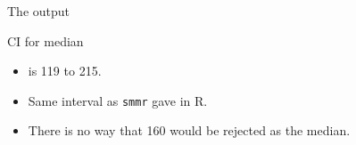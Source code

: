 \documentclass[unknownkeysallowed]{beamer}\usepackage[]{graphicx}\usepackage[]{color}
\begin{document}
\begin{frame}[fragile]{The output}
  
  
  
\end{frame}

\begin{frame}[fragile]{CI for median}

  \begin{itemize}
  \item is 119 to 215.
  \item Same interval as \texttt{smmr} gave in R.
  \item   There is no way that 160 would be rejected as the median.
  \end{itemize}
  
  
\end{frame}
\end{document}
